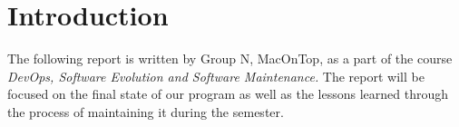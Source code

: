 \newpage
\section{Introduction}
The following report is written by Group N, MacOnTop, as a part of the course \textit{DevOps, Software Evolution and Software Maintenance.} The report will be focused on the final state of our program as well as the lessons learned through the process of maintaining it during the semester. 

